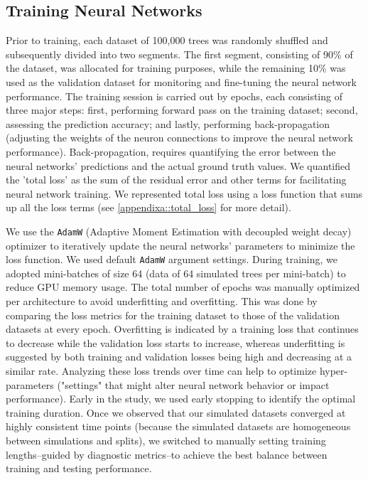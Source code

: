 {\subsection{Training Neural Networks}
\label{ch2::sec::methods::train_test}
Prior to training, each dataset of 100,000 trees was randomly shuffled and subsequently divided into two segments. The first segment, consisting of 90\% of the dataset, was allocated for training purposes, while the remaining 10\% was used as the validation dataset for monitoring and fine-tuning the neural network performance. The training session is carried out by epochs, each consisting of three major steps: first, performing forward pass on the training dataset; second, assessing the prediction accuracy; and lastly, performing back-propagation (adjusting the weights of the neuron connections to improve the neural network performance). Back-propagation, requires quantifying the error between the neural networks' predictions and the actual ground truth values. We quantified the 'total loss' as the sum of the residual error and other terms for facilitating neural network training. We represented total loss using a loss function that sums up all the loss terms (see \autoref{appendixa::total_loss} for more detail).

We use the \texttt{AdamW} (Adaptive Moment Estimation with decoupled weight decay) optimizer \citep{loshchilov_decoupled_2017} to iteratively update the neural networks' parameters to minimize the loss function. We used default \texttt{AdamW} argument settings. During training, we adopted mini-batches of size 64 (data of 64 simulated trees per mini-batch) to reduce GPU memory usage. The total number of epochs was manually optimized per architecture to avoid underfitting and overfitting. This was done by comparing the loss metrics for the training dataset to those of the validation datasets at every epoch. Overfitting is indicated by a training loss that continues to decrease while the validation loss starts to increase, whereas underfitting is suggested by both training and validation losses being high and decreasing at a similar rate. Analyzing these loss trends over time can help to optimize hyper-parameters ("settings" that might alter neural network behavior or impact performance). Early in the study, we used early stopping to identify the optimal training duration. Once we observed that our simulated datasets converged at highly consistent time points (because the simulated datasets are homogeneous between simulations and splits), we switched to manually setting training lengths--guided by diagnostic metrics--to achieve the best balance between training and testing performance.

}
